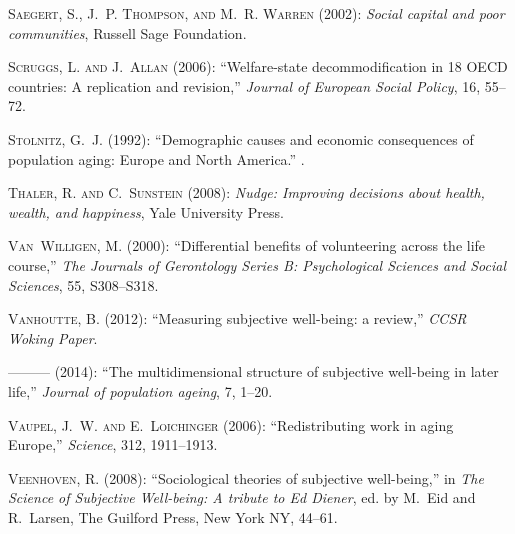\documentclass[10pt, letterpaper]{article}
\begin{document}
\begin{spacing}{1.4}
\begin{thebibliography}{87}
\textsc{Saegert, S., J.~P. Thompson, and M.~R. Warren} (2002): \emph{Social
  capital and poor communities}, Russell Sage Foundation.

\textsc{Scruggs, L. and J.~Allan} (2006): \enquote{Welfare-state
  decommodification in 18 OECD countries: A replication and revision,}
  \emph{Journal of European Social Policy}, 16, 55--72.

\textsc{Stolnitz, G.~J.} (1992): \enquote{Demographic causes and economic
  consequences of population aging: Europe and North America.} .

\textsc{Thaler, R. and C.~Sunstein} (2008): \emph{Nudge: Improving decisions
  about health, wealth, and happiness}, Yale University Press.

\textsc{Van~Willigen, M.} (2000): \enquote{Differential benefits of
  volunteering across the life course,} \emph{The Journals of Gerontology
  Series B: Psychological Sciences and Social Sciences}, 55, S308--S318.

\textsc{Vanhoutte, B.} (2012): \enquote{Measuring subjective well-being: a
  review,} \emph{CCSR Woking Paper}.

---\hspace{-.1pt}---\hspace{-.1pt}--- (2014): \enquote{The multidimensional
  structure of subjective well-being in later life,} \emph{Journal of
  population ageing}, 7, 1--20.

\textsc{Vaupel, J.~W. and E.~Loichinger} (2006): \enquote{Redistributing work
  in aging Europe,} \emph{Science}, 312, 1911--1913.

\textsc{Veenhoven, R.} (2008): \enquote{Sociological theories of subjective
  well-being,} in \emph{The Science of Subjective Well-being: A tribute to Ed
  Diener}, ed. by M.~Eid and R.~Larsen, The Guilford Press, New York NY,
  44--61.


\end{thebibliography}
\end{spacing}
\end{document}
